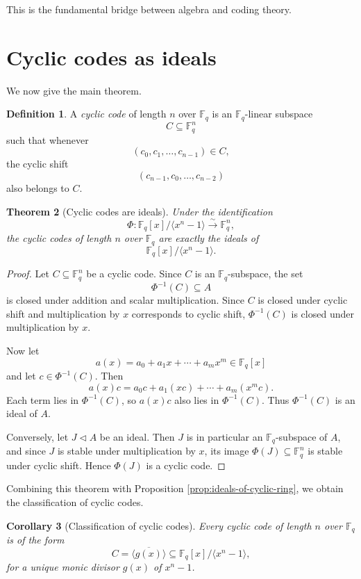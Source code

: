\documentclass[11pt]{article}
\newtheorem{theorem}{Theorem}[section]
\newtheorem{corollary}[theorem]{Corollary}
\theoremstyle{definition}
\newtheorem{definition}[theorem]{Definition}
\newcommand{\F}{\mathbb{F}}
\newcommand{\ideal}[1]{\langle #1\rangle}
\newcommand{\ol}[1]{\overline{#1}}
\begin{document}
	This is the fundamental bridge between algebra and coding theory.
	
	\section{Cyclic codes as ideals}
	
	We now give the main theorem.
	
	\begin{definition}
		A \emph{cyclic code} of length $n$ over $\F_q$ is an $\F_q$-linear subspace
		\[
		C\subseteq \F_q^n
		\]
		such that whenever
		\[
		(c_0,c_1,\dots,c_{n-1})\in C,
		\]
		the cyclic shift
		\[
		(c_{n-1},c_0,\dots,c_{n-2})
		\]
		also belongs to $C$.
	\end{definition}
	
	\begin{theorem}[Cyclic codes are ideals]\label{thm:cyclic-ideal}
		Under the identification
		\[
		\Phi:\F_q[x]/\ideal{x^n-1}\xrightarrow{\sim}\F_q^n,
		\]
		the cyclic codes of length $n$ over $\F_q$ are exactly the ideals of
		\[
		\F_q[x]/\ideal{x^n-1}.
		\]
	\end{theorem}
	
	\begin{proof}
		Let $C\subseteq \F_q^n$ be a cyclic code. Since $C$ is an $\F_q$-subspace, the set
		\[
		\Phi^{-1}(C)\subseteq A
		\]
		is closed under addition and scalar multiplication. Since $C$ is closed under cyclic shift and multiplication by $x$ corresponds to cyclic shift, $\Phi^{-1}(C)$ is closed under multiplication by $x$.
		
		Now let
		\[
		a(x)=a_0+a_1x+\cdots+a_mx^m\in \F_q[x]
		\]
		and let $c\in \Phi^{-1}(C)$. Then
		\[
		a(x)c
		=
		a_0c+a_1(xc)+\cdots+a_m(x^m c).
		\]
		Each term lies in $\Phi^{-1}(C)$, so $a(x)c$ also lies in $\Phi^{-1}(C)$. Thus $\Phi^{-1}(C)$ is an ideal of $A$.
		
		Conversely, let $J\triangleleft A$ be an ideal. Then $J$ is in particular an $\F_q$-subspace of $A$, and since $J$ is stable under multiplication by $x$, its image $\Phi(J)\subseteq \F_q^n$ is stable under cyclic shift. Hence $\Phi(J)$ is a cyclic code.
	\end{proof}
	
	Combining this theorem with Proposition \ref{prop:ideals-of-cyclic-ring}, we obtain the classification of cyclic codes.
	
	\begin{corollary}[Classification of cyclic codes]
		Every cyclic code of length $n$ over $\F_q$ is of the form
		\[
		C=\ideal{\ol{g(x)}}\subseteq \F_q[x]/\ideal{x^n-1},
		\]
		for a unique monic divisor $g(x)$ of $x^n-1$.
	\end{corollary}
	
\end{document}
